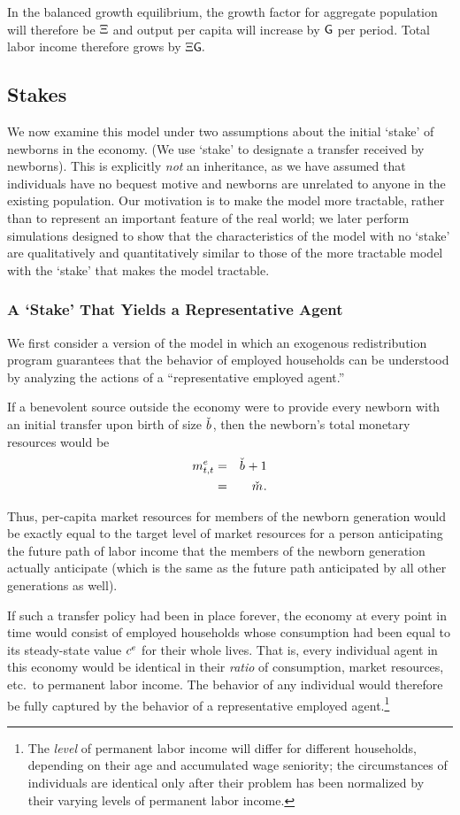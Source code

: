 \message{ !name(TractableBufferStock.tex)}\documentclass{handout}
\begin{document}
In the balanced growth equilibrium, the growth factor for aggregate population
will therefore be $\Xi$ and output per capita will increase by $\mathsf{G}$ per period.  Total
labor income therefore grows by $\Xi \mathsf{G}.$


\subsection{Stakes}

We now examine this model under two assumptions about the initial
`stake' of newborns in the economy.  (We use `stake' to designate a
transfer received by newborns).  This is explicitly {\it not} an
inheritance, as we have assumed that individuals have no bequest
motive and newborns are unrelated to anyone in the existing
population.  Our motivation is to make the model more tractable,
rather than to represent an important feature of the real world; we
later perform simulations designed to show that the characteristics of
the model with no `stake' are qualitatively and quantitatively similar
to those of the more tractable model with the `stake' that makes the
model tractable.

\subsubsection{A `Stake' That Yields a Representative Agent}

We first consider a version of the model in which an exogenous
redistribution program guarantees that the behavior of employed households can 
be understood by analyzing the actions of a ``representative employed agent.''  

If a benevolent source outside the economy were to provide every newborn with an initial
transfer upon birth of size $\bTarg^{\null}$, then the newborn's total monetary resources 
would be
\begin{eqnarray*}
  \mRatE_{t,t} & = & \bTarg^{\null} + 1
\\ & = & \mTarg^{\null} 
.
\end{eqnarray*}

Thus, per-capita market resources for members of the newborn generation
would be exactly equal to the target level of market resources for a
person anticipating the future path of labor income that the members of the newborn
generation actually anticipate (which is the same as the future path
anticipated by all other generations as well).

If such a transfer policy had been in place forever, the economy at every 
point in time would consist of employed households whose consumption had 
been equal to its steady-state value $c^{e}$ for their whole lives.  That is, every 
individual agent in this economy would be identical in their {\it ratio} of consumption,
market resources, etc.\ to permanent labor income.  
The behavior of any individual would therefore be fully captured by the behavior
of a representative employed agent.\footnote{The {\it level} of permanent 
labor income will differ for different households, depending on their age
and accumulated wage seniority; the circumstances of individuals are identical
only after their problem has been normalized by their varying levels of permanent 
labor income.}
\end{document}
